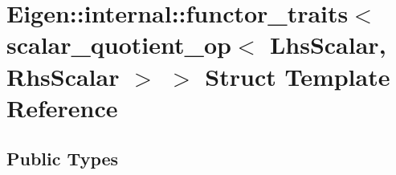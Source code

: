 \hypertarget{struct_eigen_1_1internal_1_1functor__traits_3_01scalar__quotient__op_3_01_lhs_scalar_00_01_rhs_scalar_01_4_01_4}{}\section{Eigen\+:\+:internal\+:\+:functor\+\_\+traits$<$ scalar\+\_\+quotient\+\_\+op$<$ Lhs\+Scalar, Rhs\+Scalar $>$ $>$ Struct Template Reference}
\label{struct_eigen_1_1internal_1_1functor__traits_3_01scalar__quotient__op_3_01_lhs_scalar_00_01_rhs_scalar_01_4_01_4}
\subsection*{Public Types}
